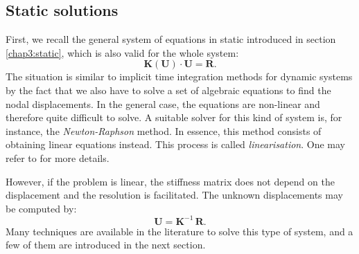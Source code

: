 	\subsection{Static solutions}
First, we recall the general system of equations in static introduced in section \ref{chap3:static}, which is also valid for the whole system: 
\begin{equation}
\mathbf{K}(\mathbf{U}) \cdot \mathbf{U} = \mathbf{R}.
\end{equation}	
The situation is similar to implicit time integration methods for dynamic systems by the fact that we also have to solve a set of algebraic equations to find the nodal displacements. In the general case, the equations are non-linear and therefore quite difficult to solve. A suitable solver for this kind of system is, for instance, the \emph{Newton-Raphson} method. In essence, this method consists of obtaining linear equations instead. This process is called \emph{linearisation}. One may refer to \citep{Belytschko00} for more details. 

However, if the problem is linear, the stiffness matrix does not depend on the displacement and the resolution is facilitated. The unknown displacements may be computed by:
\begin{equation}
\mathbf{U} = \mathbf{K}^{-1} \, \mathbf{R}.
\end{equation}
Many techniques are available in the literature to solve this type of system, and a few of them are introduced in the next section. 



